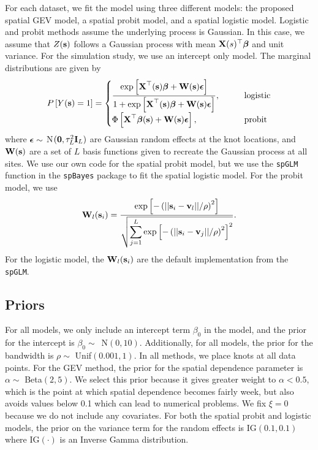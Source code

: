 \documentclass[11pt]{article}
\begin{document}
For each dataset, we fit the model using three different models: the proposed spatial GEV model, a spatial probit model, and a spatial logistic model.
Logistic and probit methods assume the underlying process is Gaussian.
In this case, we assume that $Z(\mbox{\bf s})$ follows a Gaussian process with mean $\mbox{\bf X}(s)^\top \mbox{\boldmath $\beta$}$ and unit variance.
For the simulation study, we use an intercept only model.
The marginal distributions are given by
\begin{align}
  P\left[Y(\mbox{\bf s}) = 1\right] = \begin{cases}
    \displaystyle \frac{\exp\left[\mbox{\bf X}^\top(\mbox{\bf s}) \mbox{\boldmath $\beta$} + \mbox{\bf W} (\mbox{\bf s}) \mbox{\boldmath $\epsilon$} \right]}{1 + \exp\left[\mbox{\bf X}^\top(\mbox{\bf s}) \mbox{\boldmath $\beta$} + \mbox{\bf W} (\mbox{\bf s}) \mbox{\boldmath $\epsilon$} \right]}, \qquad &\text{logistic}\\
    \Phi\left[\mbox{\bf X}^\top \mbox{\boldmath $\beta$} (\mbox{\bf s}) + \mbox{\bf W} (\mbox{\bf s}) \mbox{\boldmath $\epsilon$} \right], \qquad &\text{probit}
  \end{cases}
\end{align}
where $\mbox{\boldmath $\epsilon$} \sim$ N$(\mbox{\boldmath $0$}, \tau^2_L \mbox{\bf I}_L)$ are Gaussian random effects at the knot locations, and $\mbox{\bf W}(\mbox{\bf s})$ are a set of $L$ basis functions given to recreate the Gaussian process at all sites.
We use our own code for the spatial probit model, but we use the \texttt{spGLM} function in the \texttt{spBayes} package \citep{Finley2015} to fit the spatial logistic model.
For the probit model, we use
\begin{align}
  \mbox{\bf W}_l(\mbox{\bf s}_i) = \frac{\exp\left[-\left(||\mbox{\bf s}_i-\mbox{\bf v}_l||/\rho\right)^2\right]}
                 {\sqrt{\displaystyle \sum_{j=1}^L\exp\left[-\left(||\mbox{\bf s}_i-\mbox{\bf v}_j||/\rho\right)^2\right]^2}}.
\end{align}
For the logistic model, the $\mbox{\bf W}_l(\mbox{\bf s}_i)$ are the default implementation from the \texttt{spGLM}.

\subsection{Priors} \label{rbs:simpriors}

For all models, we only include an intercept term $\beta_0$ in the model, and the prior for the intercept is \mbox{$\beta_0 \sim$ N$(0, 10)$}.
Additionally, for all models, the prior for the bandwidth is $\rho \sim$ Unif$(0.001, 1)$.
In all methods, we place knots at all data points.
For the GEV method, the prior for the spatial dependence parameter is $\alpha \sim$ Beta$(2, 5)$.
We select this prior because it gives greater weight to $\alpha < 0.5$, which is the point at which spatial dependence becomes fairly week, but also avoids values below 0.1 which can lead to numerical problems.
We fix $\xi = 0$ because we do not include any covariates.
For both the spatial probit and logistic models, the prior on the variance term for the random effects is IG$(0.1, 0.1)$ where IG$(\cdot)$ is an Inverse Gamma distribution.
\end{document}
